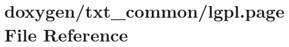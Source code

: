 \hypertarget{lgpl_8page}{\section{doxygen/txt\-\_\-common/lgpl.page File Reference}
\label{lgpl_8page}
}
